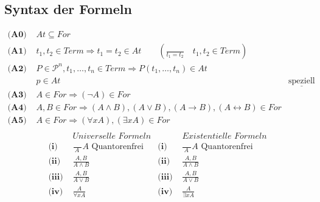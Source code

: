 \documentclass{article}
\begin{document}
		\subsection{Syntax der Formeln}
			\begin{align*}
				\textbf{(A0) } & At \subseteq For\\
				\textbf{(A1) } & t_1, t_2 \in Term \Rightarrow t_1 = t_2 \in  At \qquad(\frac{\qquad}{t_1 = t_2} \quad t_1, t_2 \in Term)\\
				\textbf{(A2) } & P \in \mathcal{P}^n, t_1,\ldots,t_n \in Term \Rightarrow P(t_1, \ldots, t_n) \in  At\\
				& p \in At & \underline{\text{speziell}}\ \\
				\textbf{(A3) } & A \in For \Rightarrow (\neg A) \in For\\
				\textbf{(A4) } & A, B \in For \Rightarrow (A \wedge B), (A \vee B), (A \rightarrow B), (A \leftrightarrow B) \in For\\
				\textbf{(A5) } & A \in For \Rightarrow (\forall x A), (\exists x A) \in For\\
			\end{align*}
			\begin{align*}
				& \textit{Universelle Formeln} & & \textit{Existentielle Formeln}\\
				\textbf{(i) } & \frac{}{\ A\ \ } A \text{ Quantorenfrei} & \textbf{(i) } & \frac{}{\ A\ \ } A \text{ Quantorenfrei}\\
				\textbf{(ii) } & \frac{A, B}{A \wedge B} & \textbf{(ii) } & \frac{A, B}{A \wedge B}\\
				\textbf{(iii) } & \frac{A, B}{A \vee B} & \textbf{(iii) } & \frac{A, B}{A \vee B}\\
				\textbf{(iv) } & \frac{A}{\forall x A} & \textbf{(iv) } & \frac{A}{\exists x A}\\
			\end{align*}
\end{document}
